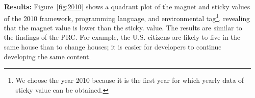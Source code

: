 \documentclass[english,preprint,JIP,technote]{ipsj}
\begin{document}





\noindent \textbf{Results:}
Figure~\ref{fig:2010} shows a quadrant plot of the magnet and sticky values ​​of the 2010 framework, programming language, and environmental tag\footnote{We choose the year 2010 because it is the first year for which yearly data of sticky value can be obtained.}, revealing that the magnet value is lower than the sticky. value. The results are similar to the findings of the PRC. For example, the U.S. citizens are likely to live in the same house than to change houses; it is easier for developers to continue developing the same content.
\end{document}
